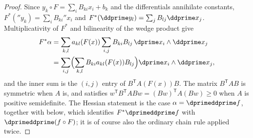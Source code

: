 \begin{proof}
Since $y_k\circ F=\sum_iB_{ki}x_i+b_k$ and the differentials annihilate
constants, $F^*(\dprime y_k)=\sum_iB_{ki}\dprime x_i$ and
$F^*(\ddprime y_l)=\sum_jB_{lj}\ddprime x_j$.  Multiplicativity of $F^*$ and
bilinearity of the wedge product give
\[
 \begin{aligned}
  F^*\alpha
   &=\sum_{k,l}a_{kl}(F(x))\sum_{i,j}B_{ki}B_{lj}\,
     \dprime x_i\wedge\ddprime x_j\\
   &=\sum_{i,j}\Bigl(\sum_{k,l}B_{ki}a_{kl}(F(x))B_{lj}\Bigr)
     \dprime x_i\wedge\ddprime x_j,
 \end{aligned}
\]
and the inner sum is the $(i,j)$ entry of $B^{\mathsf T}A(F(x))B$.  The
matrix $B^{\mathsf T}AB$ is symmetric when $A$ is, and satisfies
$w^{\mathsf T}B^{\mathsf T}ABw=(Bw)^{\mathsf T}A(Bw)\geq0$ when $A$ is
positive semidefinite.  The Hessian statement is the case
$\alpha=\dprimeddprime f$, together with
 below, which identifies
$F^*\dprimeddprime f$ with $\dprimeddprime(f\circ F)$; it is of course also
the ordinary chain rule applied twice.
\end{proof}

